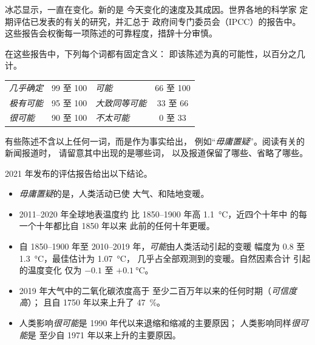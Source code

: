 冰芯显示，一直在变化。新的是
今天变化的速度及其成因。世界各地的科学家
定期评估已发表的有关的研究，并汇总于
政府间专门委员会（IPCC）的报告中。
这些报告会权衡每一项陈述的可靠程度，措辞十分审慎。

在这些报告中，下列每个词都有固定含义：
即该陈述为真的可能性，以百分之几计。

\begin{center}
{\small
\begin{tabular}{|l|c||l|c|}
\hline
\emph{几乎确定} & 99 至 100 & \emph{可能} & 66 至 100 \\
\emph{极有可能} & 95 至 100 & \emph{大致同等可能} & 33 至 66 \\
\emph{很可能} & 90 至 100 & \emph{不太可能} & 0 至 33 \\
\hline
\end{tabular}}
\end{center}

\noindent 有些陈述不含以上任何一词，而是作为事实给出，
例如“\emph{毋庸置疑}”。阅读有关的新闻报道时，
请留意其中出现的是哪些词，
以及报道保留了哪些、省略了哪些。

2021 年发布的评估报告给出以下结论。
\begin{itemize}
  \item \emph{毋庸置疑}的是，人类活动已使
        大气、和陆地变暖。
  \item 2011--2020 年全球地表温度约
        比 1850--1900 年高 \qty{1.1}{\degreeCelsius}，近四个十年中
        的每一个十年都比自 1850 年以来
        此前的任何十年更暖。
  \item 自 1850--1900 年至 2010--2019 年，\emph{可能}由人类活动引起的变暖
        幅度为 0.8 至 \qty{1.3}{\degreeCelsius}，最佳估计为 \qty{1.07}{\degreeCelsius}，
        几乎占全部观测到的变暖。自然因素合计
        引起的温度变化
        仅为 $-0.1$ 至 $+\qty{0.1}{\degreeCelsius}$。
  \item 2019 年大气中的二氧化碳浓度高于
        至少二百万年以来的任何时期（\emph{可信度高}）；
        且自 1750 年以来上升了 47~\%。
  \item 人类影响\emph{很可能}是
        1990 年代以来退缩和缩减的主要原因；
        人类影响同样\emph{很可能}是
        至少自 1971 年以来上升的主要原因。
\end{itemize}

